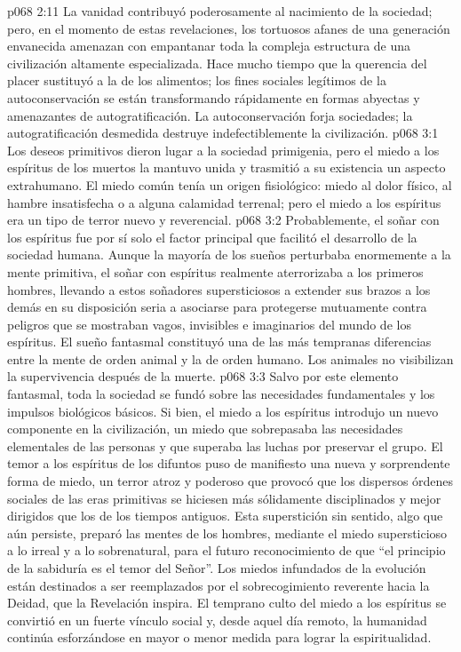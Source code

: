 \vs p068 2:11 La vanidad contribuyó poderosamente al nacimiento de la sociedad; pero, en el momento de estas revelaciones, los tortuosos afanes de una generación envanecida amenazan con empantanar toda la compleja estructura de una civilización altamente especializada. Hace mucho tiempo que la querencia del placer sustituyó a la de los alimentos; los fines sociales legítimos de la autoconservación se están transformando rápidamente en formas abyectas y amenazantes de autogratificación. La autoconservación forja sociedades; la autogratificación desmedida destruye indefectiblemente la civilización.
\vs p068 3:1 Los deseos primitivos dieron lugar a la sociedad primigenia, pero el miedo a los espíritus de los muertos la mantuvo unida y trasmitió a su existencia un aspecto extrahumano. El miedo común tenía un origen fisiológico: miedo al dolor físico, al hambre insatisfecha o a alguna calamidad terrenal; pero el miedo a los espíritus era un tipo de terror nuevo y reverencial.
\vs p068 3:2 Probablemente, el soñar con los espíritus fue por sí solo el factor principal que facilitó el desarrollo de la sociedad humana. Aunque la mayoría de los sueños perturbaba enormemente a la mente primitiva, el soñar con espíritus realmente aterrorizaba a los primeros hombres, llevando a estos soñadores supersticiosos a extender sus brazos a los demás en su disposición seria a asociarse para protegerse mutuamente contra peligros que se mostraban vagos, invisibles e imaginarios del mundo de los espíritus. El sueño fantasmal constituyó una de las más tempranas diferencias entre la mente de orden animal y la de orden humano. Los animales no visibilizan la supervivencia después de la muerte.
\vs p068 3:3 Salvo por este elemento fantasmal, toda la sociedad se fundó sobre las necesidades fundamentales y los impulsos biológicos básicos. Si bien, el miedo a los espíritus introdujo un nuevo componente en la civilización, un miedo que sobrepasaba las necesidades elementales de las personas y que superaba las luchas por preservar el grupo. El temor a los espíritus de los difuntos puso de manifiesto una nueva y sorprendente forma de miedo, un terror atroz y poderoso que provocó que los dispersos órdenes sociales de las eras primitivas se hiciesen más sólidamente disciplinados y mejor dirigidos que los de los tiempos antiguos. Esta superstición sin sentido, algo que aún persiste, preparó las mentes de los hombres, mediante el miedo supersticioso a lo irreal y a lo sobrenatural, para el futuro reconocimiento de que “el principio de la sabiduría es el temor del Señor”. Los miedos infundados de la evolución están destinados a ser reemplazados por el sobrecogimiento reverente hacia la Deidad, que la Revelación inspira. El temprano culto del miedo a los espíritus se convirtió en un fuerte vínculo social y, desde aquel día remoto, la humanidad continúa esforzándose en mayor o menor medida para lograr la espiritualidad.
